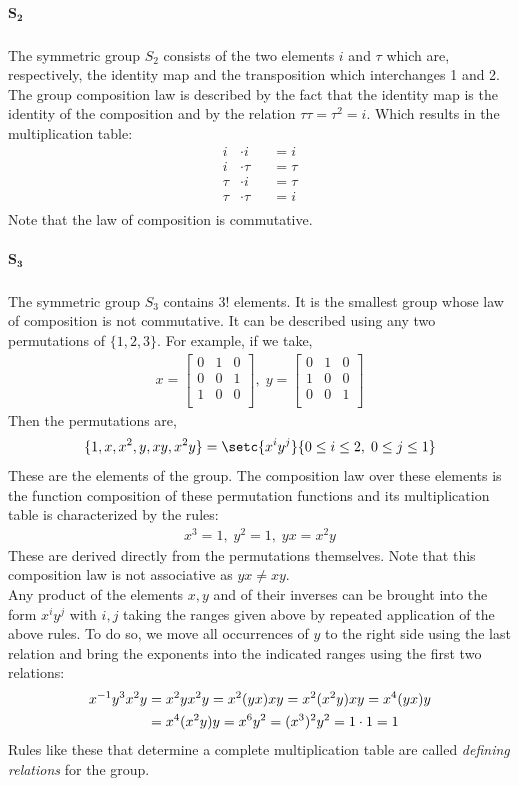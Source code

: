 \documentclass[MathsNotesBase.tex]{subfiles}
\begin{document}
{		\subparagraph{$\bm{S_2}$}
		The symmetric group $S_2$ consists of the two elements $i$ and $\tau$ which are, respectively, the identity map and the transposition which interchanges 1 and 2. The group composition law is described by the fact that the identity map is the identity of the composition and by the relation $\tau\tau = \tau^2 = i$. Which results in the multiplication table:	
		\[
		\begin{aligned}
			i &\cdot i &&= i \\
			i &\cdot \tau &&= \tau \\		
			\tau &\cdot i &&= \tau \\
			\tau &\cdot \tau &&= i \\
		\end{aligned}
		\]
		Note that the law of composition is commutative.
		\subparagraph{$\bm{S_3}$}\label{S_3}
		The symmetric group $S_3$ contains $3!$ elements. It is the smallest group whose law of composition is not commutative. It can be described using any two permutations of $\{1, 2, 3\}$. For example, if we take,
		\begin{align*}
			x =
			\begin{bmatrix}
			0 & 1 & 0 \\
			0 & 0 & 1 \\
			1 & 0 & 0 \\
			\end{bmatrix},\;
			y =
			\begin{bmatrix}
			0 & 1 & 0 \\
			1 & 0 & 0 \\
			0 & 0 & 1 \\
			\end{bmatrix}
		\end{align*}
		Then the permutations are,
		\[ \{1, x, x^2, y, xy, x^2y\} = \setc{x^iy^j}{0 \leq i \leq 2,\; 0 \leq j \leq 1} \]
		These are the elements of the group. The composition law over these elements is the function composition of these permutation functions and its multiplication table is characterized by the rules:
		\begin{align*}
			x^3 = 1,\; y^2 = 1,\; yx = x^2y
		\end{align*}
		These are derived directly from the permutations themselves. Note that this composition law is not associative as $yx \neq xy$. \\
		Any product of the elements $x,y$ and of their inverses can be brought into the form $x^iy^j$ with $i,j$ taking the ranges given above by repeated application of the above rules. To do so, we move all occurrences of $y$  to the right side using the last relation and bring the exponents into the indicated ranges using the first two relations:
		\begin{align*} 
			{x}^{-1}y^3x^2y &= x^2yx^2y = x^2(yx)xy = x^2(x^2y)xy = x^4(yx)y\\
						&= x^4(x^2y)y = x^6y^2 = (x^3)^2y^2 = 1 \cdot 1 = 1
		\end{align*}
		Rules like these that determine a complete multiplication table are called \textit{defining relations} for the group.	
	}
	
\end{document}
